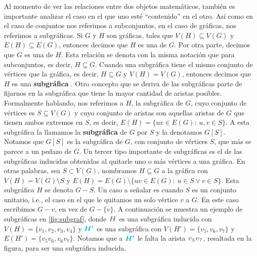 Al momento de ver las relaciones entre dos objetos matem\'aticos, tambi\'en es
importante analizar el caso en el que uno est\'e ``contenido'' en el otro. As\'i
como en el caso de conjuntos nos referimos a subconjuntos, en el caso de
gr\'aficas, nos referimos a subgr\'aficas. Si $G$ y $H$ son gr\'aficas, tales
que $V(H) \subseteq V(G)$ y $E(H) \subseteq E(G)$, entonces decimos que $H$ es
una  de $G$. Por otra parte, decimos que $G$ es una
 de $H$. Esta relaci\'on se denota con la misma
notaci\'on que para subconjuntos, es decir, $H \subseteq G$. Cuando una
subgr\'afica tiene el mismo conjunto de v\'ertices que la gr\'afica, es decir,
$H \subseteq G$ y $V(H)= V(G)$, entonces decimos que $H$ es una
\textbf{subgr\'afica} . Otro concepto que se
deriva de las subgr\'aficas parte de fijarnos en la subgr\'afica que tiene la
mayor cantidad de aristas posibles. Formalmente hablando, nos referimos a $H$,
la subgr\'afica de $G$, cuyo conjunto de v\'ertices es $S \subseteq V(G)$ y cuyo
conjunto de aristas son aquellas aristas de $G$ que tienen ambos extremos en
$S$, es decir, $E(H) = \{uv \in E(G) \colon\ u,v \in S\}$. A esta subgr\'afica
la llamamos la \textbf{subgr\'afica}  de $G$
por $S$ y la denotamos $G[S]$. Notamos que $G[S]$ es la subgr\'afica de $G$, con
conjunto de v\'ertices $S$, que m\'as se parece a un pedazo de $G$. Un tercer
tipo importante de subgr\'aficas es el de las subgr\'aficas inducidas obtenidas
al quitarle uno o m\'as v\'ertices a una gr\'afica. En otras palabras, sea $S
\subset V(G)$, nombramos $H \subseteq G$ a la gr\'afica con $V(H)=V(G) \setminus
S$ y $E(H) = E(G)\setminus\{uv \in E(G) \colon\ u \in S \lor v \in S\}$. Esta
subgr\'afica $H$ se denota $G-S$. Un caso a se\~{n}alar es cuando $S$ es un
conjunto unitario, i.e., el caso en el que le quitamos un solo v\'ertice $v$ a
$G$. En este caso escribimos $G-v$, en vez de $G-\{v\}$. A continuaci\'on se
muestra un ejemplo de subgr\'aficas en \cref{fig:subgraf}, donde
${\color{morado}\boldsymbol {H}}$ es una subgr\'afica inducida con $V(H) =
\{v_1,v_2,v_3,v_4\}$ y ${\color{azulCielo}{\boldsymbol{ H'}}}$ es una subgr\'afica con
$V(H')=\{v_5,v_6,v_7\}$ y $E(H')=\{v_5v_6,  v_6v_7\}$. Notamos que a
${\color{azulCielo}\boldsymbol {H'}}$ le falta la arista ${\color{grisOscuro!80}\boldsymbol
{v_5v_7}}$, resaltada en la figura, para ser una subgr\'afica inducida. 

